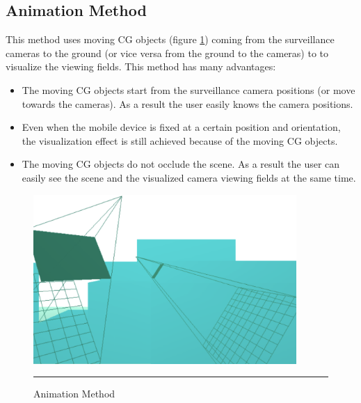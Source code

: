 \subsection{Animation Method}

This method uses moving CG objects (figure \ref{fig:AnimationMethod}) coming from the surveillance cameras to the ground (or vice versa from the ground to the cameras) to to visualize the viewing fields. This method has  many advantages:

\begin{itemize}
	\item The moving CG objects start from the surveillance camera positions (or move towards the cameras). As a result the user easily knows the camera positions.
	\item Even when the mobile device is fixed at a certain position and orientation, the visualization effect is still achieved because of the moving CG objects.
	\item The moving CG objects do not occlude the scene. As a result the user can easily see the scene and the visualized camera viewing fields at the same time.
\end{itemize}

\begin{figure}[htbp]
	\centering
	\includegraphics[width=10cm]{./Primitives/theory_animation.png}
	\rule{35em}{0.5pt}
	\caption[Animation Method]{Animation Method}
	\label{fig:AnimationMethod}
\end{figure}
